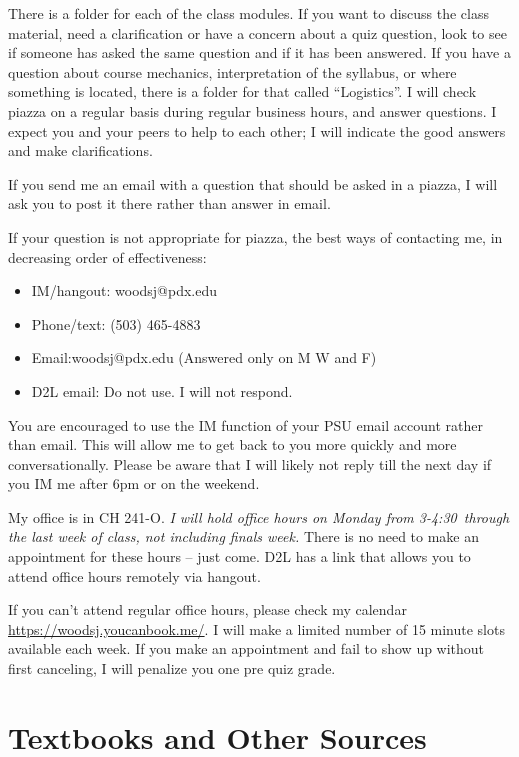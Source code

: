 \documentclass[letterpaper,10pt]{article}
\newcommand{\Office}{on Monday from 3-4:30}
\begin{document}
There is a folder for each of the class modules. If you want to discuss the class material, need a clarification or have a concern about a quiz question, look to see if someone has asked the same question and if it has been answered.  If you have a question about course mechanics, interpretation of the syllabus, or where something is located, there is a folder for that called ``Logistics''. I will check piazza on a regular basis during regular business hours, and answer questions. I expect you and your peers to help to each other; I will indicate the good answers and make clarifications.  

If you send me an email with a question that should be asked in a piazza, I
will ask you to post it there rather than answer in email.

If your question is not appropriate for piazza, the best ways of contacting me, in
decreasing order of effectiveness:
\begin{itemize}
\item IM/hangout: woodsj@pdx.edu
\item Phone/text: (503) 465-4883
\item Email:woodsj@pdx.edu (Answered only on M W and F)
\item D2L email: Do not use.  I will not respond.
\end{itemize}

You are encouraged to use the IM function of your PSU email account rather than email. This will allow me to get back to you more quickly and more conversationally. Please be aware that I will likely not reply till the next day if you IM me after 6pm or on the weekend.  

My office is in CH 241-O.  \emph{I will hold office hours \Office ~through the last week of class, not including finals week.} There is no need to make an appointment for these hours -- just come.  D2L has a link that allows you to attend office hours remotely via hangout.

If you can’t attend regular office hours, please check my calendar \url{https://woodsj.youcanbook.me/}. I will make a limited number of 15 minute slots available each week. If you make an appointment and fail to show up without first canceling, I will penalize you one pre quiz grade.  


 
\section{Textbooks and Other Sources}
\end{document}
